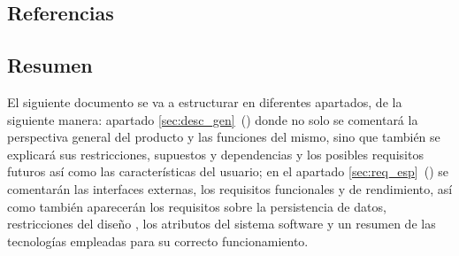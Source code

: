 \subsection{Referencias}
\printbibliography[heading=none]
\subsection{Resumen}
El siguiente documento se va a estructurar en diferentes apartados, de la siguiente manera: apartado \ref{sec:desc_gen}~() donde no solo se comentará la perspectiva general del producto y las funciones del mismo, sino que también se explicará sus restricciones, supuestos y dependencias y los posibles requisitos futuros así como las características del usuario; en el apartado \ref{sec:req_esp}~() se comentarán las interfaces externas, los requisitos funcionales y de rendimiento, así como también aparecerán los requisitos sobre la persistencia de datos, restricciones del diseño , los atributos del sistema software y un resumen de las tecnologías empleadas para su correcto funcionamiento.
